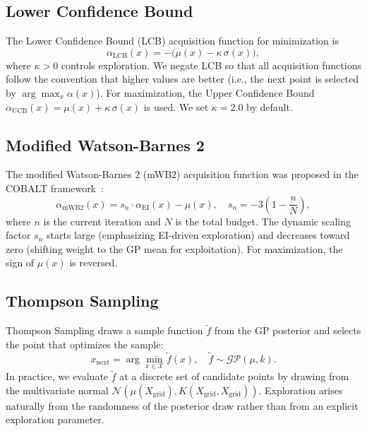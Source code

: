 \documentclass[12pt,a4paper]{article}%
\theoremstyle{plain}%
\theoremstyle{remark}%
\theoremstyle{definition}%
\begin{document}
\begin{appendices}
\subsection{Lower Confidence Bound}\label{subsec:app_lcb}

The Lower Confidence Bound (LCB) acquisition function for minimization is
\begin{equation}\label{eq:lcb}
    \alpha_\text{LCB}(x) = -\bigl(\mu(x) - \kappa\,\sigma(x)\bigr),
\end{equation}
where $\kappa > 0$ controls exploration. We negate LCB so that all acquisition functions follow the convention that higher values are better (i.e., the next point is selected by $\arg\max_x \alpha(x)$). For maximization, the Upper Confidence Bound $\alpha_\text{UCB}(x) = \mu(x) + \kappa\,\sigma(x)$ is used. We set $\kappa = 2.0$ by default.

\subsection{Modified Watson-Barnes 2}\label{subsec:app_mwb2}

The modified Watson-Barnes 2 (mWB2) acquisition function was proposed in the COBALT framework~\cite{paulson2022cobalt}:
\begin{equation}\label{eq:mwb2}
    \alpha_\text{mWB2}(x) = s_n \cdot \alpha_\text{EI}(x) - \mu(x), \quad s_n = -3\left(1 - \frac{n}{N}\right),
\end{equation}
where $n$ is the current iteration and $N$ is the total budget. The dynamic scaling factor $s_n$ starts large (emphasizing EI-driven exploration) and decreases toward zero (shifting weight to the GP mean for exploitation). For maximization, the sign of $\mu(x)$ is reversed.

\subsection{Thompson Sampling}\label{subsec:app_thompson}

Thompson Sampling draws a sample function $\tilde{f}$ from the GP posterior and selects the point that optimizes the sample:
\begin{equation}\label{eq:thompson}
    x_\text{next} = \arg\min_{x \in \mathcal{X}} \tilde{f}(x), \quad \tilde{f} \sim \mathcal{GP}(\mu, k).
\end{equation}
In practice, we evaluate $\tilde{f}$ at a discrete set of candidate points by drawing from the multivariate normal $\mathcal{N}(\mu(X_\text{grid}), K(X_\text{grid}, X_\text{grid}))$. Exploration arises naturally from the randomness of the posterior draw rather than from an explicit exploration parameter.


\end{appendices}
\end{document}

